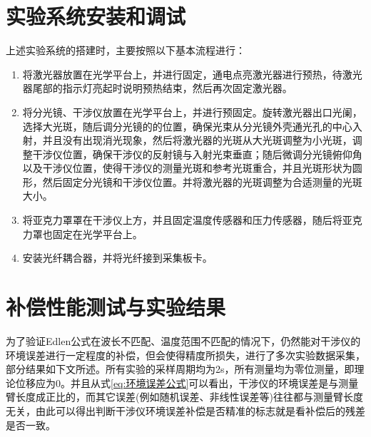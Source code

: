 \section{实验系统安装和调试}
上述实验系统的搭建时，主要按照以下基本流程进行：
\begin{enumerate}
    \item 将激光器放置在光学平台上，并进行固定，通电点亮激光器进行预热，待激光器尾部的指示灯亮起时说明预热结束，然后再次固定激光器。
    \item 将分光镜、干涉仪放置在光学平台上，并进行预固定。旋转激光器出口光阑，选择大光斑，随后调分光镜的的位置，确保光束从分光镜外壳通光孔的中心入射，并且没有出现消光现象，然后将激光器的光斑从大光斑调整为小光斑，调整干涉仪位置，确保干涉仪的反射镜与入射光束垂直；随后微调分光镜俯仰角以及干涉仪位置，使得干涉仪的测量光斑和参考光斑重合，并且光斑形状为圆形，然后固定分光镜和干涉仪位置。并将激光器的光斑调整为合适测量的光斑大小。
    \item 将亚克力罩罩在干涉仪上方，并且固定温度传感器和压力传感器，随后将亚克力罩也固定在光学平台上。
    \item 安装光纤耦合器，并将光纤接到采集板卡。
  \end{enumerate}
  \section{补偿性能测试与实验结果}
为了验证Edlen公式在波长不匹配、温度范围不匹配的情况下，仍然能对干涉仪的环境误差进行一定程度的补偿，但会使得精度所损失，进行了多次实验数据采集，部分结果如下文所述。所有实验的采样周期均为2s，所有测量均为零位测量，即理论位移应为0。并且从式\eqref{eq:环境误差公式}可以看出，干涉仪的环境误差是与测量臂长度成正比的，而其它误差(例如随机误差、非线性误差等)往往都与测量臂长度无关，由此可以得出判断干涉仪环境误差补偿是否精准的标志就是看补偿后的残差是否一致。

